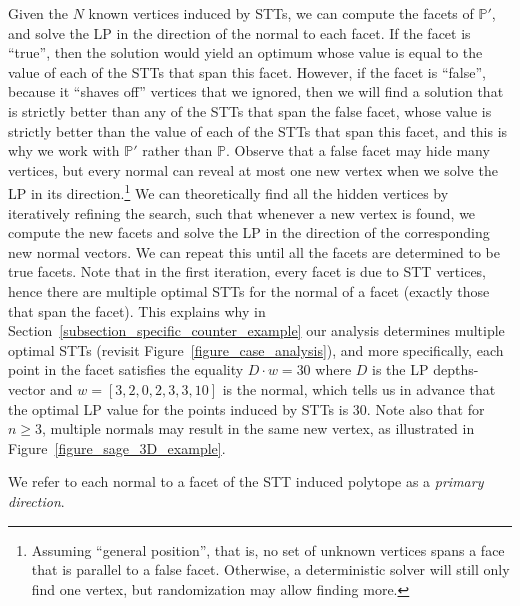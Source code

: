 Given the $N$ known vertices induced by STTs, we can compute the facets of $\mathbb{P}'$, and solve the LP in the direction of the normal to each facet. If the facet is ``true'', then the solution would yield an optimum whose value is equal to the value of each of the STTs that span this facet. However, if the facet is ``false'', because it ``shaves off'' vertices that we ignored, then we will find a solution that is strictly better than any of the STTs that span the false facet, whose value is strictly better than the value of each of the STTs that span this facet, and this is why we work with $\mathbb{P}'$ rather than $\mathbb{P}$.  Observe that a false facet may hide many vertices, but every normal can reveal at most one new vertex when we solve the LP in its direction.\footnote{Assuming ``general position'', that is, no set of unknown vertices spans a face that is parallel to a false facet. Otherwise, a deterministic solver will still only find one vertex, but randomization may allow finding more.} We can theoretically find all the hidden vertices by iteratively refining the search, such that whenever a new vertex is found, we compute the new facets and solve the LP in the direction of the corresponding new normal vectors. We can repeat this until all the facets are determined to be true facets. Note that in the first iteration, every facet is due to STT vertices, hence there are multiple optimal STTs for the normal of a facet (exactly those that span the facet). This explains why in Section~\ref{subsection_specific_counter_example} our analysis determines multiple optimal STTs (revisit Figure~\ref{figure_case_analysis}), and more specifically, each point in the facet satisfies the equality $D \cdot w = 30$ where $D$ is the LP depths-vector and $w = [3,2,0,2,3,3,10]$ is the normal, which tells us in advance that the optimal LP value for the points induced by STTs is $30$. Note also that for $n \ge 3$, multiple normals may result in the same new vertex, as illustrated in Figure~\ref{figure_sage_3D_example}.









\begin{definition}
\label{definition_primary_direction_terminology}
We refer to each normal to a facet of the STT induced polytope as a \emph{primary direction}.
\end{definition}

